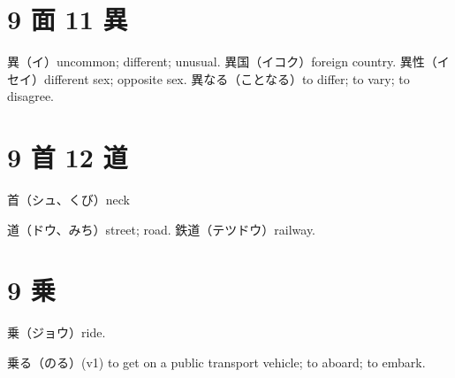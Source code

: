 \section{9 面 11 異}

異（イ）uncommon; different; unusual.
異国（イコク）foreign country.
異性（イセイ）different sex; opposite sex.
異なる（ことなる）to differ; to vary; to disagree.

\section{9 首 12 道}

首（シュ、くび）neck

道（ドウ、みち）street; road.
鉄道（テツドウ）railway.

\section{9 乗}

乗（ジョウ）ride.

乗る（のる）(v1) to get on a public transport vehicle; to aboard; to embark.

